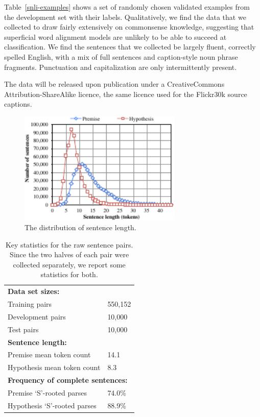 Table~\ref{snli-examples} shows a set of randomly chosen validated examples from the development set with their labels. Qualitatively, we find the data that we collected to draw fairly extensively on commonsense knowledge, suggesting that superficial word alignment models are unlikely to be able to succeed at classification. We find the sentences that we collected be largely fluent, correctly spelled English, with a mix of full sentences and caption-style noun phrase fragments. Punctuation and capitalization are only intermittently present.


The data will be released upon publication under a CreativeCommons
Attribution-ShareAlike licence, the same licence used for the Flickr30k source captions.

\begin{figure}
\center
\includegraphics[width=3.05in]{length_dist}
\caption{\label{b-table}The distribution of sentence length.} 
\end{figure}

\begin{table}
\center
  \begin{tabular}{l l} 
    \toprule
\multicolumn{2}{l}{\textbf{Data set sizes:}}\\
Training pairs &  550,152\\
Development pairs &  10,000\\
Test pairs & 10,000\\
\midrule
\multicolumn{2}{l}{\textbf{Sentence length:}}\\
Premise mean token count & 14.1\\
Hypothesis mean token count & 8.3 \\
\midrule
\multicolumn{2}{l}{\textbf{Frequency of complete sentences:}}\\
Premise `S'-rooted parses & 74.0\%\\
Hypothesis `S'-rooted parses & 88.9\%\\
    \bottomrule
  \end{tabular}
\caption{\label{collection-stats}Key statistics for the raw sentence pairs. Since the two halves of each pair were collected separately, we report some statistics for both.} 
\end{table}

